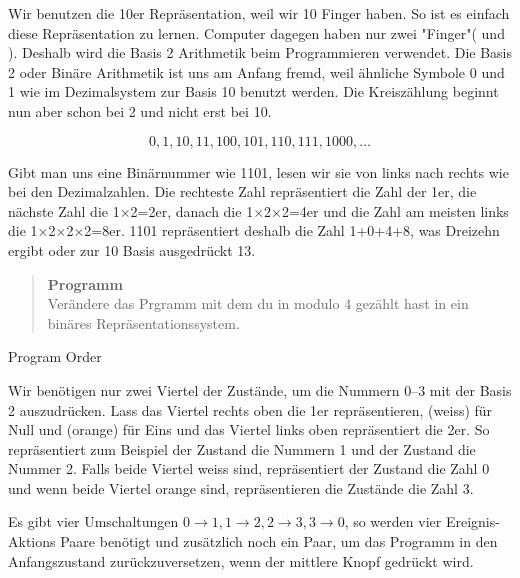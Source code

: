Wir benutzen die 10er Repräsentation, weil wir 10 Finger haben. So ist es einfach diese Repräsentation zu lernen. Computer dagegen haben nur zwei "Finger"( und ).
Deshalb wird die Basis 2 Arithmetik beim Programmieren verwendet. Die Basis 2 oder Binäre Arithmetik ist uns am Anfang fremd, weil ähnliche Symbole 0 und 1 wie im Dezimalsystem zur Basis 10 benutzt werden. Die Kreiszählung beginnt nun aber schon bei 2 und nicht erst bei 10.

\begin{displaymath}
0, 1, 10, 11, 100, 101, 110, 111, 1000, \ldots
\end{displaymath}

Gibt man uns eine Binärnummer wie 1101, lesen wir sie von links nach rechts wie bei den Dezimalzahlen. Die rechteste Zahl repräsentiert die Zahl der 1er, die nächste Zahl die 1$\times$2=2er, danach die 1$\times$2$\times$2=4er und die Zahl am meisten links die 1$\times$2$\times$2$\times$2=8er.
1101 repräsentiert deshalb die Zahl 1+0+4+8, was Dreizehn ergibt oder zur 10 Basis ausgedrückt 13.

\newpage

\begin{quote}
\textbf{Programm}\\
Verändere das Prgramm mit dem du in modulo 4 gezählt hast in ein binäres Repräsentationssystem.
\end{quote}

{\raggedleft \hfill Program Order }

Wir benötigen nur zwei Viertel der Zustände, um die Nummern 0--3 mit der Basis 2 auszudrücken. Lass das Viertel rechts oben die 1er repräsentieren,  (weiss) für Null und  (orange) für Eins und das Viertel links oben repräsentiert die 2er. So repräsentiert zum Beispiel der Zustand  die Nummern 1 und der Zustand  die Nummer 2.
Falls beide Viertel weiss sind, repräsentiert der Zustand die Zahl 0 und wenn beide Viertel orange sind, repräsentieren die Zustände die Zahl 3.

Es gibt vier Umschaltungen $0\rightarrow 1, 1\rightarrow 2, 2
\rightarrow 3, 3\rightarrow 0$, so werden vier Ereignis-Aktions Paare benötigt und zusätzlich noch ein Paar, um das Programm in den Anfangszustand zurückzuversetzen, wenn der mittlere Knopf gedrückt wird.


\medskip



